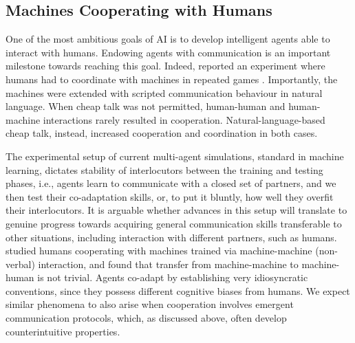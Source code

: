 \subsection{Machines Cooperating with Humans}
\label{sec:nll-learning}

One of the most ambitious goals of AI is to develop intelligent agents able to interact with humans.  Endowing agents with communication is an important milestone towards reaching this goal. Indeed,  reported an experiment where humans had to coordinate with machines in repeated games \cite{Crandall:Goodrich:2010}. Importantly,  the machines were extended with scripted communication behaviour in natural language.  %
When cheap talk was not permitted, human-human and human-machine interactions rarely resulted in cooperation. Natural-language-based cheap talk, instead, increased cooperation and coordination in both cases.

The experimental setup of current multi-agent simulations, standard in machine learning, dictates stability of interlocutors between the training and testing phases, i.e., agents learn to communicate with a closed set of partners, and we then test their co-adaptation skills, or, to put it bluntly, how well they overfit their interlocutors. It is arguable whether advances in this setup will translate to genuine progress towards acquiring 
general communication skills transferable to other situations,
including interaction with different partners, such as
humans.  studied humans cooperating with
machines trained via machine-machine (non-verbal) interaction, and
found that transfer from machine-machine to machine-human is not trivial. Agents co-adapt by establishing very idiosyncratic
conventions, since they possess different cognitive biases from
humans. We expect similar phenomena to also arise when cooperation
involves emergent communication protocols, which, as discussed above, often
develop counterintuitive properties.

